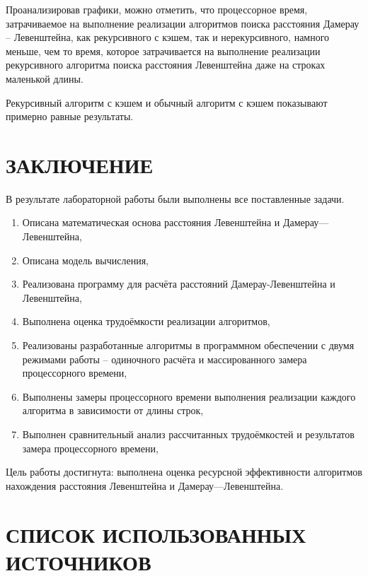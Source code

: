 \documentclass[14pt]{article}
\begin{document}
Проанализировав графики, можно отметить, что процессорное время, затрачиваемое на выполнение реализации алгоритмов поиска расстояния Дамерау -- Левенштейна, как рекурсивного с кэшем, так и нерекурсивного, намного меньше, чем то время, которое затрачивается на выполнение реализации рекурсивного алгоритма поиска расстояния Левенштейна даже на строках маленькой длины.

Рекурсивный алгоритм с кэшем и обычный алгоритм с кэшем показывают примерно равные результаты.

\newpage
\section*{ЗАКЛЮЧЕНИЕ}
В результате лабораторной работы были выполнены все поставленные задачи.
\begin{enumerate}
    \item Описана математическая основа расстояния Левенштейна и Дамерау---Левен\-штейна,
    \item Описана модель вычисления,
    \item Реализована программу для расчёта расстояний Дамерау-Левенштейна и Левенштейна,
    \item Выполнена оценка трудоёмкости реализации алгоритмов,
    \item Реализованы разработанные алгоритмы в программном обеспечении с двумя режимами работы -- одиночного расчёта и массированного замера процессорного времени,
    \item Выполнены замеры процессорного времени выполнения реализации каждого алгоритма в зависимости от длины строк,
    \item Выполнен сравнительный анализ рассчитанных трудоёмкостей и результатов замера процессорного времени,
\end{enumerate}

Цель работы достигнута: выполнена оценка ресурсной эффективности алгоритмов нахождения расстояния Левенштейна и Дамерау---Левенштейна.



\newpage
\section*{СПИСОК ИСПОЛЬЗОВАННЫХ ИСТОЧНИКОВ}
\end{document}
